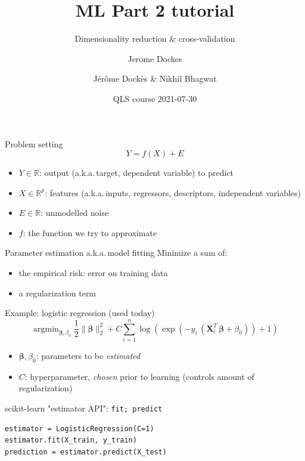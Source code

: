 \documentclass[presentation,mathserif,table]{beamer}
\author{Jerome Dockes}
\date{}
\title{ML Part 2 tutorial}
\author{Jérôme Dockès \& Nikhil Bhagwat}
\date{QLS course 2021-07-30}
\subtitle{Dimensionality reduction \& cross-validation}
\newcommand{\aka}{a.k.a.\,}
\newcommand{\X}{{\mathbold X}}
\newcommand{\bbeta}{{\mathbold \beta}}
\newcommand{\R}{\mathbb{R}}
\DeclareMathOperator*{\argmin}{argmin}
\begin{document}
\maketitle
\begin{frame}[label={sec:org26628ba}]{Problem setting}
\begin{equation}
Y = f(X) + E
\end{equation}
\vspace{-10pt}
\begin{itemize}
\item \(Y \in \R\): output (\aka target, dependent variable) to predict
\item \(X \in \R^p\): features (\aka inputs, regressors, descriptors, independent variables)
\item \(E \in \R\): unmodelled noise
\item \(f\): the function we try to approximate
\end{itemize}
\end{frame}
\begin{frame}[label={sec:org64a8279}]{Parameter estimation \aka model fitting}
Minimize a sum of:
\begin{itemize}
\item the empirical risk: error on training data
\item a regularization term
\end{itemize}
\begin{block}{Example: logistic regression (used today)}
\begin{equation}
\argmin_{\bbeta, \beta_0} \frac{1}{2} \| \bbeta \|_2^2 + C \sum_{i=1}^n \log(\exp(-y_i \, (\X_i^T \, \bbeta + \beta_0)) + 1)
\end{equation}
\end{block}
\begin{structureenv} %
\begin{itemize}
\item \(\bbeta, \beta_0\): parameters to be \emph{estimated}
\item \(C\): hyperparameter, \emph{chosen} prior to learning
(controls amount of regularization)
\end{itemize}
\end{structureenv}
\end{frame}
\begin{frame}[label={sec:orgfe9f529},fragile]{scikit-learn "estimator API": \texttt{fit; predict}}
 \begin{verbatim}
estimator = LogisticRegression(C=1)
estimator.fit(X_train, y_train)
prediction = estimator.predict(X_test)
\end{verbatim}
\end{frame}
\end{document}
